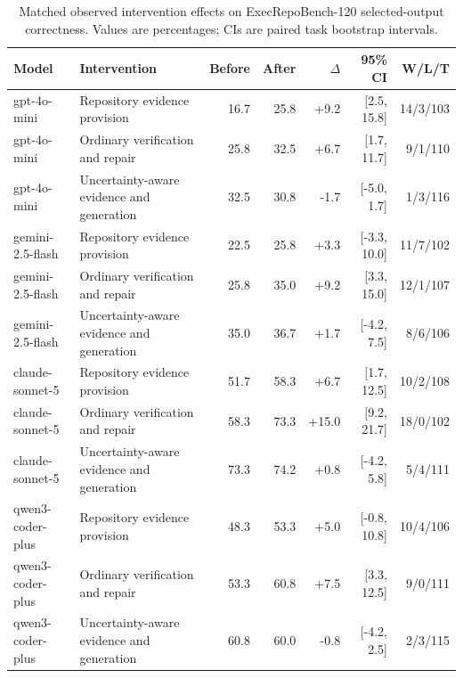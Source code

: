 \begin{table}[t]
\centering
\small
\caption{Matched observed intervention effects on ExecRepoBench-120 selected-output correctness. Values are percentages; CIs are paired task bootstrap intervals.}
\label{tab:intervention_effects}
\begin{tabular}{llrrrrr}
\toprule
Model & Intervention & Before & After & $\Delta$ & 95\% CI & W/L/T \\
\midrule
gpt-4o-mini & Repository evidence provision & 16.7 & 25.8 & +9.2 & [2.5, 15.8] & 14/3/103 \\
gpt-4o-mini & Ordinary verification and repair & 25.8 & 32.5 & +6.7 & [1.7, 11.7] & 9/1/110 \\
gpt-4o-mini & Uncertainty-aware evidence and generation & 32.5 & 30.8 & -1.7 & [-5.0, 1.7] & 1/3/116 \\
gemini-2.5-flash & Repository evidence provision & 22.5 & 25.8 & +3.3 & [-3.3, 10.0] & 11/7/102 \\
gemini-2.5-flash & Ordinary verification and repair & 25.8 & 35.0 & +9.2 & [3.3, 15.0] & 12/1/107 \\
gemini-2.5-flash & Uncertainty-aware evidence and generation & 35.0 & 36.7 & +1.7 & [-4.2, 7.5] & 8/6/106 \\
claude-sonnet-5 & Repository evidence provision & 51.7 & 58.3 & +6.7 & [1.7, 12.5] & 10/2/108 \\
claude-sonnet-5 & Ordinary verification and repair & 58.3 & 73.3 & +15.0 & [9.2, 21.7] & 18/0/102 \\
claude-sonnet-5 & Uncertainty-aware evidence and generation & 73.3 & 74.2 & +0.8 & [-4.2, 5.8] & 5/4/111 \\
qwen3-coder-plus & Repository evidence provision & 48.3 & 53.3 & +5.0 & [-0.8, 10.8] & 10/4/106 \\
qwen3-coder-plus & Ordinary verification and repair & 53.3 & 60.8 & +7.5 & [3.3, 12.5] & 9/0/111 \\
qwen3-coder-plus & Uncertainty-aware evidence and generation & 60.8 & 60.0 & -0.8 & [-4.2, 2.5] & 2/3/115 \\
\bottomrule
\end{tabular}
\end{table}
